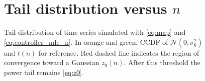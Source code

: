 \documentclass[a4paper, 11pt]{report}
\newcommand{\N}[0]{\mathcal{N}}
\begin{document}
\begin{figure}[!h]
\section{Tail distribution versus $n$}\label{app:ccdf_n}
	\centering
	\caption{Tail distribution of time series simulated with \eqref{eq:map} and \eqref{eq:controller_mle_n}. In orange and green, CCDF of $\N(0,\sigma_0^2)$ and $t(n)$ for reference. Red dashed line indicates the region of convergence toward a Gaussian $z_0(n)$. After this threshold the power tail remains \eqref{eq:z0}.}
	\label{fig:ccdf_n}
\end{figure}



\end{document}

